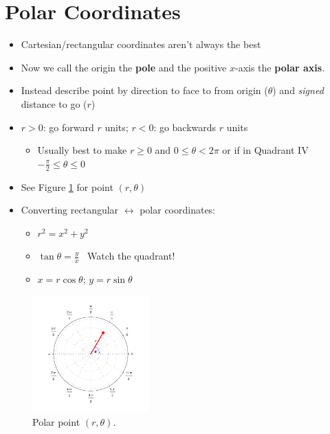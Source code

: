 \documentclass[letterpaper, 11pt, openany]{book}
\theoremstyle{mytheoremstyle}
\theoremstyle{myexamplestyle}
\begin{document}
\section{Polar Coordinates}
\setcounter{figure}{0}

\begin{itemize}
    \item Cartesian/rectangular coordinates aren't always the best \faMeh
    \item Now we call the origin the \textbf{pole} and the positive $x$-axis the \textbf{polar axis}.
    \item Instead describe point by direction to face to from origin ($\theta$) and \textit{signed} distance to go ($r$)
    \item $r>0$: go forward $r$ units; $r<0$: go backwards $r$ units \faMeh
    \begin{itemize}
        \item Usually best to make $r \geq 0$ and $0 \leq \theta < 2\pi$ or if in Quadrant IV $-\frac{\pi}{2} \leq \theta \leq 0$
    \end{itemize}
    \item See Figure \ref{f:polarpoint} for point $(r, \theta)$
    \item Converting rectangular $\leftrightarrow$ polar coordinates:
    \begin{itemize}
        \item $r^{2} = x^{2} + y^{2}$
        \item $\tan \theta = \frac{y}{x}$ \faExclamationTriangle[solid] \ Watch the quadrant!
        \item $x = r \cos \theta$; $y = r \sin \theta$ 
    \end{itemize}
\end{itemize}
\begin{figure}[htbp]
    \centering
        \includegraphics[width = 0.4\textwidth]{Figures/polarpoint.pdf}
    \caption{Polar point $(r, \theta)$.}
    \label{f:polarpoint}
\end{figure}
\end{document}
